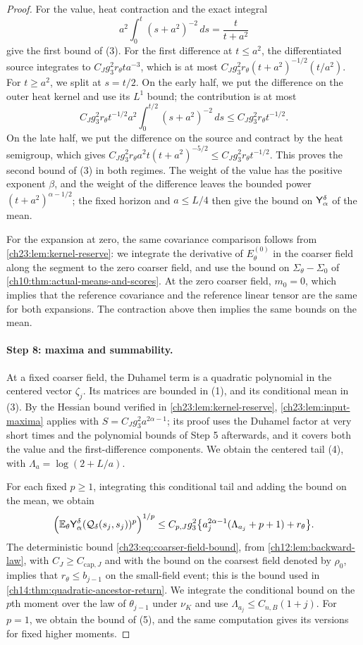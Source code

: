 \begin{proof}
For the value, heat contraction and the exact integral
\[
 a^2\int_0^t(s+a^2)^{-2}\,ds=\frac{t}{t+a^2}
\]
give the first bound of (3). For the first difference at $t\le a^2$, the differentiated source integrates to $C_Jg_3^2r_\theta ta^{-3}$, which is at most $C_Jg_3^2r_\theta(t+a^2)^{-1/2}(t/a^2)$. For $t\ge a^2$, we split at $s=t/2$. On the early half, we put the difference on the outer heat kernel and use its $L^1$ bound; the contribution is at most
\[
 C_Jg_3^2r_\theta t^{-1/2}a^2\int_0^{t/2}(s+a^2)^{-2}\,ds\le C_Jg_3^2r_\theta t^{-1/2}.
\]
On the late half, we put the difference on the source and contract by the heat semigroup, which gives $C_Jg_3^2r_\theta a^2t(t+a^2)^{-5/2}\le C_Jg_3^2r_\theta t^{-1/2}$. This proves the second bound of (3) in both regimes. The weight of the value has the positive exponent $\beta$, and the weight of the difference leaves the bounded power $(t+a^2)^{\alpha-1/2}$; the fixed horizon and $a\le L/4$ then give the bound on $\mathsf Y_{\alpha}^{\delta}$ of the mean.

For the expansion at zero, the same covariance comparison follows from \cref{ch23:lem:kernel-reserve}: we integrate the derivative of $E_\theta^{(0)}$ in the coarser field along the segment to the zero coarser field, and use the bound on $\Sigma_\theta-\Sigma_0$ of \cref{ch10:thm:actual-means-and-scores}. At the zero coarser field, $m_0=0$, which implies that the reference covariance and the reference linear tensor are the same for both expansions. The contraction above then implies the same bounds on the mean.

\paragraph{Step 8: maxima and summability.}
At a fixed coarser field, the Duhamel term is a quadratic polynomial in the centered vector $\zeta_j$. Its matrices are bounded in (1), and its conditional mean in (3). By the Hessian bound verified in \cref{ch23:lem:kernel-reserve}, \cref{ch23:lem:input-maxima} applies with $S=C_Jg_3^2a^{2\alpha-1}$; its proof uses the Duhamel factor at very short times and the polynomial bounds of Step 5 afterwards, and it covers both the value and the first-difference components. We obtain the centered tail (4), with $\Lambda_a=\log(2+L/a)$.

For each fixed $p\ge1$, integrating this conditional tail and adding the bound on the mean, we obtain
\[
 \Bigl(\mathbb E_\theta\mathsf Y_{\alpha}^{\delta}(\mathcal Q_\delta(s_j,s_j))^p\Bigr)^{1/p}\le C_{p,J}g_3^2\bigl\{a_j^{2\alpha-1}(\Lambda_{a_j}+p+1)+r_\theta\bigr\}.
\]
The deterministic bound \eqref{ch23:eq:coarser-field-bound}, from \cref{ch12:lem:backward-law}, with $C_J\ge C_{\mathrm{cap},J}$ and with the bound on the coarsest field denoted by $\rho_0$, implies that $r_\theta\le b_{j-1}$ on the small-field event; this is the bound used in \cref{ch14:thm:quadratic-ancestor-return}. We integrate the conditional bound on the $p$th moment over the law of $\theta_{j-1}$ under $\nu_K$ and use $\Lambda_{a_j}\le C_{n,B}(1+j)$. For $p=1$, we obtain the bound of (5), and the same computation gives its versions for fixed higher moments.


\end{proof}
